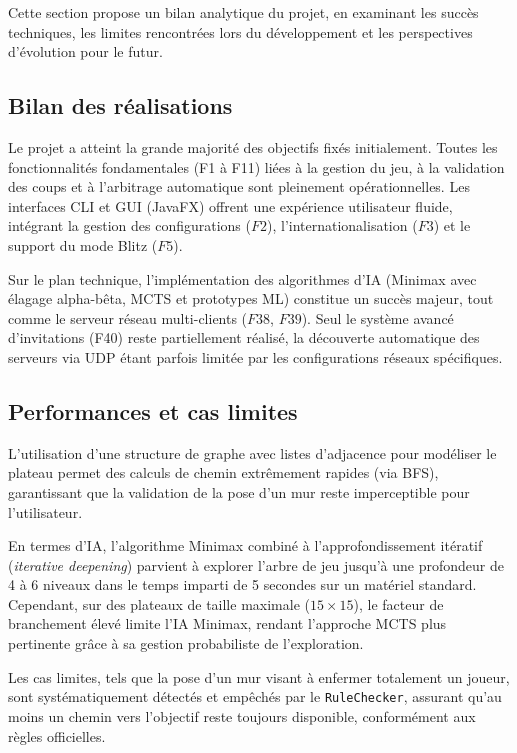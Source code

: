 \documentclass[a4paper]{article}
\begin{document}
Cette section propose un bilan analytique du projet, en examinant les succès techniques, les limites rencontrées lors du développement et les perspectives d'évolution pour le futur.

\subsection{Bilan des réalisations}

Le projet a atteint la grande majorité des objectifs fixés initialement. Toutes les fonctionnalités fondamentales (F1 à F11) liées à la gestion du jeu, à la validation des coups et à l'arbitrage automatique sont pleinement opérationnelles. Les interfaces CLI et GUI (JavaFX) offrent une expérience utilisateur fluide, intégrant la gestion des configurations ($F2$), l'internationalisation ($F3$) et le support du mode Blitz ($F5$). 

Sur le plan technique, l'implémentation des algorithmes d'IA (Minimax avec élagage alpha-bêta, MCTS et prototypes ML) constitue un succès majeur, tout comme le serveur réseau multi-clients ($F38$, $F39$). Seul le système avancé d'invitations (F40) reste partiellement réalisé, la découverte automatique des serveurs via UDP étant parfois limitée par les configurations réseaux spécifiques.

\subsection{Performances et cas limites}

L'utilisation d'une structure de graphe avec listes d'adjacence pour modéliser le plateau permet des calculs de chemin extrêmement rapides (via BFS), garantissant que la validation de la pose d'un mur reste imperceptible pour l'utilisateur.

En termes d'IA, l'algorithme Minimax combiné à l'approfondissement itératif (\emph{iterative deepening}\cite{KORF198597}) parvient à explorer l'arbre de jeu jusqu'à une profondeur de 4 à 6 niveaux dans le temps imparti de 5 secondes sur un matériel standard. Cependant, sur des plateaux de taille maximale ($15 \times 15$), le facteur de branchement élevé limite l'IA Minimax, rendant l'approche MCTS plus pertinente grâce à sa gestion probabiliste de l'exploration.

Les cas limites, tels que la pose d'un mur visant à enfermer totalement un joueur, sont systématiquement détectés et empêchés par le \texttt{RuleChecker}, assurant qu'au moins un chemin vers l'objectif reste toujours disponible, conformément aux règles officielles.
\end{document}
